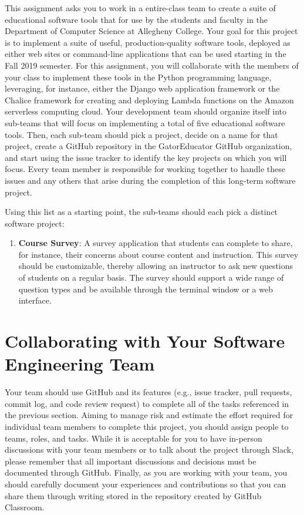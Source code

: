 \documentclass[11pt]{article}
\begin{document}

This assignment asks you to work in a entire-class team to create a suite of
educational software tools that for use by the students and faculty in the
Department of Computer Science at Allegheny College. Your goal for this project
is to implement a suite of useful, production-quality software tools, deployed
as either web sites or command-line applications that can be used starting in
the Fall 2019 semester.
%
For this assignment, you will collaborate with the members of your class to
implement these tools in the Python programming language, leveraging, for
instance, either the Django web application framework or the Chalice framework
for creating and deploying Lambda functions on the Amazon serverless computing
cloud.
%
Your development team should organize itself into sub-teams that will focus on
implementing a total of five educational software tools.
%
Then, each sub-team should pick a project, decide on a name for that project,
create a GitHub repository in the GatorEducator GitHub organization, and start
using the issue tracker to identify the key projects on which you will focus.
%
Every team member is responsible for working together to handle these issues and
any others that arise during the completion of this long-term software project.

Using this list as a starting point, the sub-teams should each pick a distinct
software project:

\begin{enumerate}

  \item {\bf Course Survey}: A survey application that students can complete to
    share, for instance, their concerns about course content and instruction.
    This survey should be customizable, thereby allowing an instructor to ask
    new questions of students on a regular basis. The survey should support a
    wide range of question types and be available through the terminal window or
    a web interface.

\end{enumerate}

\section*{Collaborating with Your Software Engineering Team}

Your team should use GitHub and its features (e.g., issue tracker, pull
requests, commit log, and code review request) to complete all of the tasks
referenced in the previous section.
%
Aiming to manage risk and estimate the effort required for individual team
members to complete this project, you should assign people to teams, roles, and
tasks. While it is acceptable for you to have in-person discussions with your
team members or to talk about the project through Slack, please remember that
all important discussions and decisions must be documented through GitHub.
Finally, as you are working with your team, you should carefully document your
experiences and contributions so that you can share them through writing stored
in the repository created by GitHub Classroom.
\end{document}
